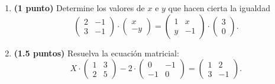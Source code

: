 
\begin{enumerate}[label=\alph*)]
\item \textbf{(1 punto)} Determine los valores de $x$ e $y$ que hacen cierta la igualdad
\[
\begin{pmatrix}2&-1\\3&-1\end{pmatrix}\cdot\begin{pmatrix}x\\-y\end{pmatrix}=\begin{pmatrix}1&x\\y&-1\end{pmatrix}\cdot\begin{pmatrix}3\\0\end{pmatrix}.
\]
\item \textbf{(1.5 puntos)} Resuelva la ecuación matricial:
\[
X\cdot\begin{pmatrix}1&3\\2&5\end{pmatrix}-2\cdot\begin{pmatrix}0&-1\\-1&0\end{pmatrix}=\begin{pmatrix}1&2\\3&-1\end{pmatrix}.
\]
\end{enumerate}
